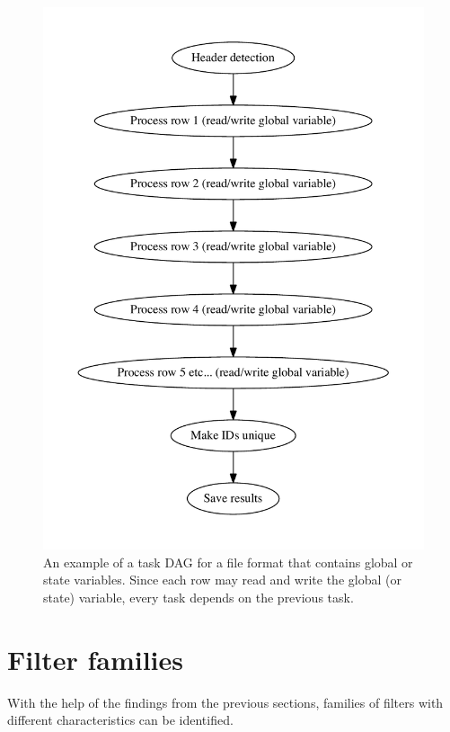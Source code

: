 \begin{figure}[ht]
  \centering
  \includegraphics[width=120mm]{figures/global_variable_file_format.pdf}
  \caption[Task DAG for a file format that contains global or state variables.]{An example of a task DAG for a file format that contains global or state variables. Since each row may read and
  write the global (or state) variable, every task depends on the previous task.}
  \label{fig:global_dag}
\end{figure}

\section{Filter families}
With the help of the findings from the previous sections, families of filters with different characteristics can be identified.

